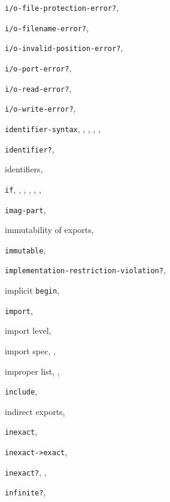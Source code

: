 {\begin{multicols}{2}
\texttt{i/o-file-protection-error?}, \textit{\pageref{exceptions_s37}}
  
\texttt{i/o-filename-error?}, \textit{\pageref{exceptions_s36}}
  
\texttt{i/o-invalid-position-error?}, \textit{\pageref{exceptions_s35}}
  
\texttt{i/o-port-error?}, \textit{\pageref{exceptions_s41}}
  
\texttt{i/o-read-error?}, \textit{\pageref{exceptions_s33}}
  
\texttt{i/o-write-error?}, \textit{\pageref{exceptions_s34}}
  
\texttt{identifier-syntax}, \pageref{syntax_s9}, \textit{\pageref{syntax_s27}}, \pageref{syntax_s43}, \pageref{syntax_s62}, \pageref{syntax_s64}
  
\texttt{identifier?}, \textit{\pageref{syntax_s35}}
  
identifiers, \pageref{intro_s30}
  
\texttt{if}, \pageref{start_s99}, \pageref{start_s102}, \pageref{start_s125}, \pageref{start_s175}, \pageref{further_s7}, \textit{\pageref{control_s8}}
  
\texttt{imag-part}, \textit{\pageref{objects_s121}}
  
immutability of exports, \pageref{libraries_s16}
  
\texttt{immutable}, \textit{\pageref{records_s16}}
  
\texttt{implementation-restriction-violation?}, \textit{\pageref{exceptions_s28}}
  
implicit \texttt{begin}, \pageref{control_s7}
  
\texttt{import}, \pageref{libraries_s4}
  
import level, \pageref{libraries_s6}
  
import spec, \pageref{libraries_s5}, \pageref{libraries_s8}
  
improper list, \pageref{start_s29}, \pageref{objects_s32}
  
\texttt{include}, \pageref{syntax_s48}
  
indirect exports, \pageref{libraries_s15}
  
\texttt{inexact}, \textit{\pageref{objects_s112}}
  
\texttt{inexact-\textgreater{}exact}, \textit{\pageref{objects_s116}}
  
\texttt{inexact?}, \pageref{objects_s74}, \textit{\pageref{objects_s87}}
  
\texttt{infinite?}, \textit{\pageref{objects_s97}}
  

\end{multicols}}

